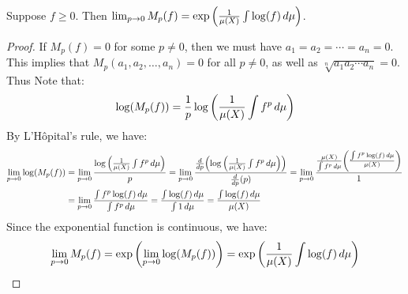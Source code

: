 \documentclass[main.tex]{subfiles}
\begin{document}
\begin{proposition}\label{geometric_mean_is_0th_holder_mean_for_integrals}
    Suppose $f\ge0$. Then $\lim_{p\to 0} M_p(f)= \exp\qty(\frac{1}{\mu(X)}\int \log(f)\,d\mu)$.
\end{proposition}
\begin{proof}
    If $M_p(f)=0$ for some $p\ne0$, then we must have $a_1=a_2= \cdots=a_n=0$. This implies that $M_p(a_1,a_2,\ldots,a_n)=0$ for all $p\ne0$, as well as $\sqrt[n]{a_1a_2\cdots a_n}=0$. Thus
    Note that:
    \begin{equation*}
        \log(M_p(f))= \frac{1}{p}\log\qty(\frac{1}{\mu(X)}\int f^p\,d\mu)
    \end{equation*}
    By L'Hôpital's rule, we have:
    \begin{align*}
        \lim_{p\to 0} \log(M_p(f))
        &= \lim_{p\to 0} \frac{\log\qty(\frac{1}{\mu(X)}\int f^p\,d\mu)}{p}
        = \lim_{p\to 0} \frac{\dv{p}\qty(\log\qty(\frac{1}{\mu(X)}\int f^p\,d\mu))}{\dv{p}(p)}
        = \lim_{p\to 0} \frac{\frac{\mu(X)}{\int f^p\,d\mu}\qty(\frac{\int f^p\log(f)\,d\mu}{\mu(X)})}{1} \\
        &= \lim_{p\to 0} \frac{\int f^p\log(f)\,d\mu}{\int f^p\,d\mu}
        = \frac{\int\log(f)\,d\mu}{\int 1\,d\mu}
        = \frac{\int\log(f)\,d\mu}{\mu(X)}
    \end{align*}
    Since the exponential function is continuous, we have:
    \begin{align*}
        \lim_{p\to 0} M_p(f)
        = \exp\qty(\lim_{p\to 0} \log(M_p(f)))
        = \exp\qty(\frac{1}{\mu(X)}\int\log(f)\,d\mu)
    \end{align*}
\end{proof}
\end{document}
